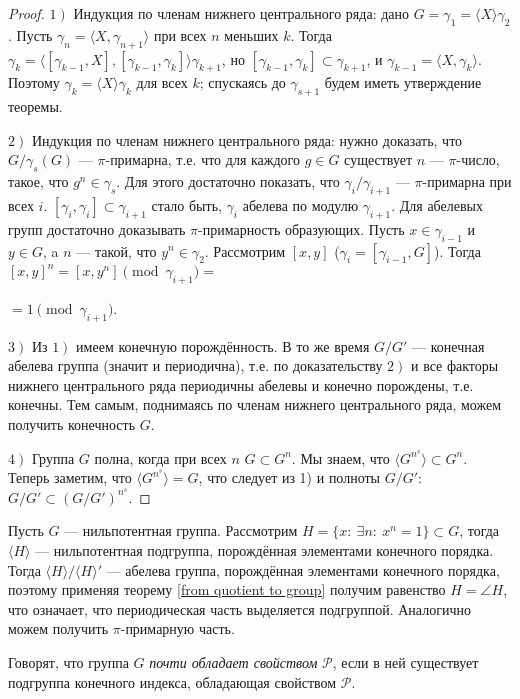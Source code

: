 \documentclass[10pt,a4paper]{article}
\begin{document}
\begin{proof} $\left.1\right)$ Индукция по членам нижнего центрального
ряда: дано $G=\gamma_1=\langle X\rangle\gamma_2$. Пусть
$\gamma_n=\langle X,\gamma_{n+1}\rangle$ при всех $n$ меньших $k$.
Тогда
$\gamma_k=\langle{[\gamma_{k-1},X],[\gamma_{k-1},\gamma_k]}\rangle\gamma_{k+1}$,
но $[\gamma_{k-1},\gamma_k]\subset\gamma_{k+1}$, и
$\gamma_{k-1}=\langle X,\gamma_k\rangle$. Поэтому
$\gamma_k=\langle X\rangle\gamma_k$ для всех $k$; спускаясь до
$\gamma_{s+1}$ будем иметь утверждение теоремы.

$\left.2\right)$ Индукция по членам нижнего центрального ряда:
нужно доказать, что $G/\gamma_s(G)$ --- $\pi$-примарна, т.е. что
для каждого $g\in G$ существует $n$ --- $\pi$-число, такое, что
$g^n\in\gamma_s$. Для этого достаточно показать, что
$\gamma_i/\gamma_{i+1}$ --- $\pi$-примарна при всех $i$.
$[\gamma_i,\gamma_i]\subset\gamma_{i+1}$ стало быть, $\gamma_i$
абелева по модулю $\gamma_{i+1}$. Для абелевых групп достаточно
доказывать $\pi$-примарность образующих. Пусть $x\in\gamma_{i-1}$
и $y\in G$, a $n$ --- такой, что $y^n\in\gamma_2$. Рассмотрим
$[x,y]$ ($\gamma_i=[\gamma_{i-1},G]$). Тогда
$[x,y]^n=[x,y^n]\pmod{\gamma_{i+1}}=$

\hfill$=1\pmod{\gamma_{i+1}}$.

$\left.3\right)$ Из $\left.1\right)$ имеем конечную порождённость.
В то же время $G/G'$
--- конечная абелева группа (значит и периодична), т.е. по доказательству $\left.2\right)$
и все факторы нижнего центрального ряда периодичны абелевы и
конечно порождены, т.е. конечны. Тем самым, поднимаясь по членам
нижнего центрального ряда, можем получить конечность $G$.

$\left.4\right)$  Группа $G$ полна, когда при всех $n$ $G\subset
G^n$. Мы знаем, что $\langle G^{n^s}\rangle\subset G^n$. Теперь
заметим, что $\langle G^{n^s}\rangle=G$, что следует из 1) и
полноты $G/G'$: $G/G'\subset(G/G')^{n^{s}}$.\end{proof}

Пусть $G$ --- нильпотентная группа. Рассмотрим $H=\{x:~\exists
n:~x^n=1\}\subset G$, тогда $\langle H\rangle$
--- нильпотентная подгруппа, порождённая элементами конечного порядка. Тогда
$\langle H\rangle/\langle H\rangle'$ --- абелева группа,
порождённая элементами конечного порядка, поэтому применяя теорему
\ref{from quotient to group} получим равенство $H=\angle{H}$, что
означает, что периодическая часть выделяется подгруппой.
Аналогично можем получить $\pi$-примарную часть.

Говорят, что группа $G$ {\em почти обладает
свойством} $\mathcal{P}$,
если в ней существует подгруппа конечного индекса, обладающая
свойством $\mathcal{P}$.
\end{document}
